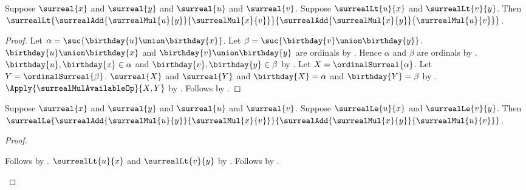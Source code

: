 \begin{theorem}\label{surreal_mul_cross_lt}
    Suppose $\surreal{x}$ and $\surreal{y}$ and
        $\surreal{u}$ and $\surreal{v}$.
    Suppose $\surrealLt{u}{x}$ and $\surrealLt{v}{y}$.
    Then
        $\surrealLt
            {\surrealAdd{\surrealMul{u}{y}}{\surrealMul{x}{v}}}
            {\surrealAdd{\surrealMul{x}{y}}{\surrealMul{u}{v}}}$.
\end{theorem}
\begin{proof}
    Let $\alpha=\suc{\birthday{u}\union\birthday{x}}$.
    Let $\beta=\suc{\birthday{v}\union\birthday{y}}$.
    $\birthday{u}\union\birthday{x}$ and
        $\birthday{v}\union\birthday{y}$ are ordinals
        by
        .
    Hence $\alpha$ and $\beta$ are ordinals by .
    $\birthday{u},\birthday{x}\in\alpha$ and
        $\birthday{v},\birthday{y}\in\beta$
        by
        .
    Let $X=\ordinalSurreal{\alpha}$.
    Let $Y=\ordinalSurreal{\beta}$.
    $\surreal{X}$ and $\surreal{Y}$ and
        $\birthday{X}=\alpha$ and $\birthday{Y}=\beta$
        by
        .
    $\Apply{\surrealMulAvailableOp}{X,Y}$
        by .
    Follows by
        .
\end{proof}

\begin{corollary}\label{surreal_mul_cross_le}
    Suppose $\surreal{x}$ and $\surreal{y}$ and
        $\surreal{u}$ and $\surreal{v}$.
    Suppose $\surrealLe{u}{x}$ and $\surrealLe{v}{y}$.
    Then
        $\surrealLe
            {\surrealAdd{\surrealMul{u}{y}}{\surrealMul{x}{v}}}
            {\surrealAdd{\surrealMul{x}{y}}{\surrealMul{u}{v}}}$.
\end{corollary}
\begin{proof}
    \begin{byCase}
            Follows by
                .
            $\surrealLt{u}{x}$ and $\surrealLt{v}{y}$
                by .
            Follows by .
    \end{byCase}
\end{proof}


